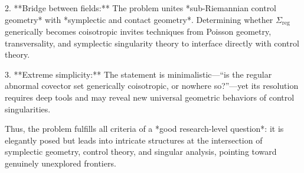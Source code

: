 2. **Bridge between fields:**  
   The problem unites *sub-Riemannian control geometry* with *symplectic and contact geometry*. Determining whether \(\Sigma_{\mathrm{reg}}\) generically becomes coisotropic invites techniques from Poisson geometry, transversality, and symplectic singularity theory to interface directly with control theory.  

3. **Extreme simplicity:**  
   The statement is minimalistic—“is the regular abnormal covector set generically coisotropic, or nowhere so?”—yet its resolution requires deep tools and may reveal new universal geometric behaviors of control singularities.  

Thus, the problem fulfills all criteria of a *good research-level question*: it is elegantly posed but leads into intricate structures at the intersection of symplectic geometry, control theory, and singular analysis, pointing toward genuinely unexplored frontiers.